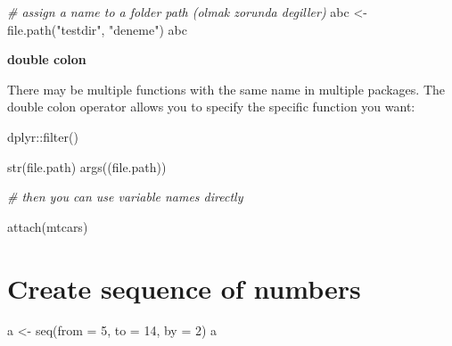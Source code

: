 \documentclass[
]{book}
\newenvironment{Shaded}{\begin{snugshade}}{\end{snugshade}}
\newcommand{\AttributeTok}[1]{\textcolor[rgb]{0.77,0.63,0.00}{#1}}
\newcommand{\CommentTok}[1]{\textcolor[rgb]{0.56,0.35,0.01}{\textit{#1}}}
\newcommand{\DecValTok}[1]{\textcolor[rgb]{0.00,0.00,0.81}{#1}}
\newcommand{\FunctionTok}[1]{\textcolor[rgb]{0.00,0.00,0.00}{#1}}
\newcommand{\NormalTok}[1]{#1}
\newcommand{\OtherTok}[1]{\textcolor[rgb]{0.56,0.35,0.01}{#1}}
\newcommand{\SpecialCharTok}[1]{\textcolor[rgb]{0.00,0.00,0.00}{#1}}
\newcommand{\StringTok}[1]{\textcolor[rgb]{0.31,0.60,0.02}{#1}}
\begin{document}
\begin{Shaded}
\begin{Highlighting}[]
\CommentTok{\# assign a name to a folder path (olmak zorunda degiller)}
\NormalTok{abc }\OtherTok{\textless{}{-}} \FunctionTok{file.path}\NormalTok{(}\StringTok{"testdir"}\NormalTok{, }\StringTok{"deneme"}\NormalTok{)}
\NormalTok{abc}
\end{Highlighting}
\end{Shaded}

\textbf{double colon}

There may be multiple functions with the same name in multiple packages. The double colon operator allows you to specify the specific function you want:

\begin{Shaded}
\begin{Highlighting}[]
\NormalTok{dplyr}\SpecialCharTok{::}\FunctionTok{filter}\NormalTok{()}
\end{Highlighting}
\end{Shaded}

\begin{Shaded}
\begin{Highlighting}[]
\FunctionTok{str}\NormalTok{(file.path)}
\FunctionTok{args}\NormalTok{((file.path))}
\end{Highlighting}
\end{Shaded}

\begin{Shaded}
\begin{Highlighting}[]
\CommentTok{\# then you can use variable names directly }

\FunctionTok{attach}\NormalTok{(mtcars)}
\end{Highlighting}
\end{Shaded}

\hypertarget{create-sequence-of-numbers}{%
\chapter{Create sequence of numbers}\label{create-sequence-of-numbers}}

\begin{Shaded}
\begin{Highlighting}[]
\NormalTok{a }\OtherTok{\textless{}{-}} \FunctionTok{seq}\NormalTok{(}\AttributeTok{from =} \DecValTok{5}\NormalTok{, }\AttributeTok{to =} \DecValTok{14}\NormalTok{, }\AttributeTok{by =} \DecValTok{2}\NormalTok{)}
\NormalTok{a}
\end{Highlighting}
\end{Shaded}
\end{document}
